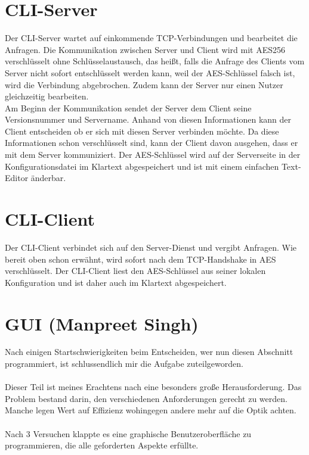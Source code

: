 \documentclass[12pt,a4paper]{report}
\begin{document}
\begin{onehalfspace}
\section{CLI-Server}

Der CLI-Server wartet auf einkommende TCP-Verbindungen und bearbeitet die Anfragen. Die Kommunikation zwischen Server und Client wird mit AES256 verschlüsselt ohne Schlüsselaustausch, das heißt, falls die Anfrage des Clients vom Server nicht sofort entschlüsselt werden kann, weil der AES-Schlüssel falsch ist, wird die Verbindung abgebrochen. Zudem kann der Server nur einen Nutzer gleichzeitig bearbeiten.\\
Am Beginn der Kommunikation sendet der Server dem Client seine Versionsnummer und Servername. Anhand von diesen Informationen kann der Client entscheiden ob er sich mit diesen Server verbinden möchte. Da diese Informationen schon verschlüsselt sind, kann der Client davon ausgehen, dass er mit dem Server kommuniziert. Der AES-Schlüssel wird auf der Serverseite in der Konfigurationsdatei im Klartext abgespeichert und ist mit einem einfachen Text-Editor änderbar.\\

\section{CLI-Client}

Der CLI-Client verbindet sich auf den Server-Dienst und vergibt Anfragen. Wie bereit oben schon erwähnt, wird sofort nach dem TCP-Handshake in AES verschlüsselt. Der CLI-Client liest den AES-Schlüssel aus seiner lokalen Konfiguration und ist daher auch im Klartext abgespeichert.

\newpage
\section{GUI (Manpreet Singh)}
Nach einigen Startschwierigkeiten beim Entscheiden, wer nun diesen Abschnitt programmiert, ist schlussendlich mir die Aufgabe zuteilgeworden.\\\\
Dieser Teil ist meines Erachtens nach eine besonders große Herausforderung. Das Problem bestand darin, den verschiedenen Anforderungen gerecht zu werden. Manche legen Wert auf Effizienz wohingegen andere mehr auf die Optik achten.\\\\
Nach 3 Versuchen klappte es eine graphische Benutzeroberfläche zu programmieren, die alle geforderten Aspekte erfüllte.\\


\end{onehalfspace}
\end{document}
